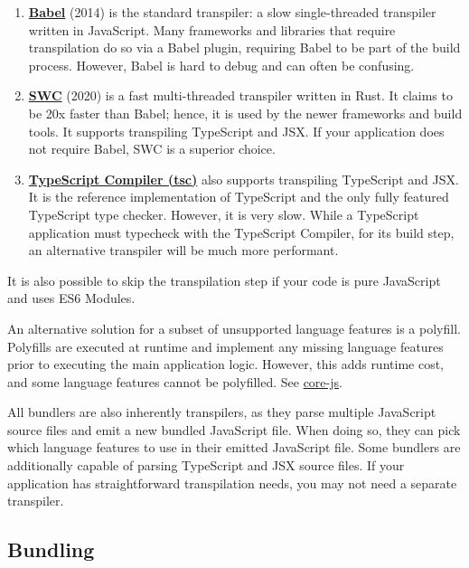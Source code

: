 \documentclass{article}
\begin{document}
\begin{enumerate}
  \item \href{https://babeljs.io/}{\textbf{Babel}} (2014) is the standard transpiler: a slow
    single-threaded transpiler written in JavaScript. Many frameworks and libraries that require
    transpilation do so via a Babel plugin, requiring Babel to be part of the build process.
    However, Babel is hard to debug and can often be confusing.

  \item \href{https://swc.rs/}{\textbf{SWC}} (2020) is a fast multi-threaded transpiler written in
    Rust. It claims to be 20x faster than Babel; hence, it is used by the newer frameworks and build
    tools. It supports transpiling TypeScript and JSX. If your application does not require Babel,
    SWC is a superior choice.

  \item \href{https://github.com/microsoft/TypeScript}{\textbf{TypeScript Compiler (tsc)}} also
    supports transpiling TypeScript and JSX. It is the reference implementation of TypeScript and
    the only fully featured TypeScript type checker. However, it is very slow. While a TypeScript
    application must typecheck with the TypeScript Compiler, for its build step, an alternative
    transpiler will be much more performant.
\end{enumerate}

It is also possible to skip the transpilation step if your code is pure JavaScript and uses ES6
Modules.

An alternative solution for a subset of unsupported language features is a polyfill. Polyfills are
executed at runtime and implement any missing language features prior to executing the main
application logic. However, this adds runtime cost, and some language features cannot be polyfilled.
See \href{https://github.com/zloirock/core-js}{core-js}.

All bundlers are also inherently transpilers, as they parse multiple JavaScript source files and
emit a new bundled JavaScript file. When doing so, they can pick which language features to use in
their emitted JavaScript file. Some bundlers are additionally capable of parsing TypeScript and JSX
source files. If your application has straightforward transpilation needs, you may not need a
separate transpiler.

\subsection{Bundling}
\end{document}
